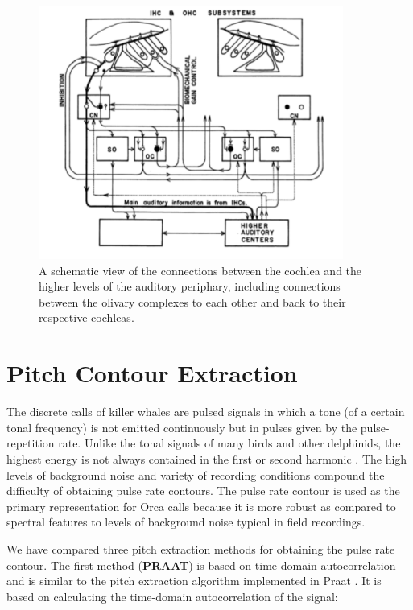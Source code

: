 \documentclass[12pt,oneside]{book}
\begin{document}
\begin{figure}[t]
\begin{center}
\includegraphics[width=100mm]{figures/ihcohc}
\caption{
A schematic view of the connections between the cochlea and the higher
levels of the auditory periphary, including connections between the
olivary complexes to each other and back to their respective cochleas.} 
\label{fig:ihcohc} 
\end{center} 
\end{figure} 


\section{Pitch Contour Extraction}  

The discrete calls of killer whales are pulsed signals in which a tone
(of a certain tonal frequency) is not emitted continuously but in
pulses given by the pulse-repetition rate. Unlike the tonal signals of
many birds and other delphinids, the highest energy is not always
contained in the first or second harmonic
\cite{deecke99_quantifying_orca}. The high levels of background noise
and variety of recording conditions compound the difficulty of
obtaining pulse rate contours. The pulse rate contour is used as the
primary representation for Orca calls because it is more robust as
compared to spectral features to levels of background noise typical in
field recordings.

We have compared three pitch extraction methods for obtaining the
pulse rate contour. The first method ({\bf PRAAT}) is based on
time-domain autocorrelation and is similar to the pitch extraction
algorithm implemented in Praat \cite{boersma93}. It is based on
calculating the time-domain autocorrelation of the signal:
\end{document}
